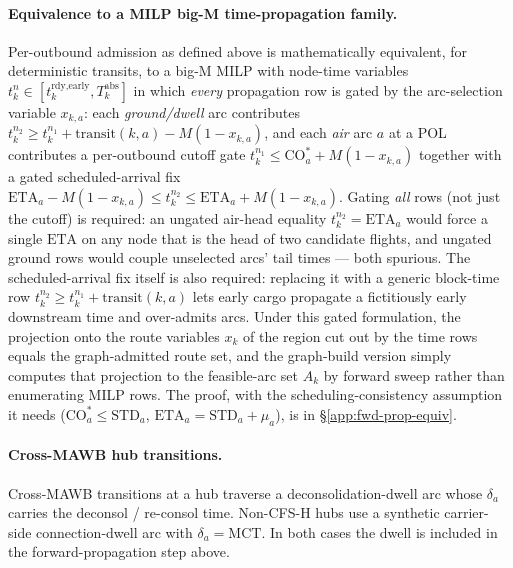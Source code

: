 \documentclass[11pt,a4paper]{article}
\theoremstyle{definition}
\begin{document}
\paragraph{Equivalence to a MILP big-M time-propagation family.}
Per-outbound admission as defined above is mathematically equivalent, for
deterministic transits, to a big-M MILP with node-time variables
$t_k^n \in [t_k^{\text{rdy,early}}, T_k^{\text{abs}}]$ in which \emph{every}
propagation row is gated by the arc-selection variable $x_{k,a}$: each
\emph{ground/dwell} arc contributes $t_k^{n_2} \geq t_k^{n_1} +
\text{transit}(k, a) - M(1 - x_{k,a})$, and each \emph{air} arc $a$ at a POL
contributes a per-outbound cutoff gate $t_k^{n_1} \leq \text{CO}_a^* +
M(1 - x_{k,a})$ together with a gated scheduled-arrival fix $\text{ETA}_a -
M(1 - x_{k,a}) \leq t_k^{n_2} \leq \text{ETA}_a + M(1 - x_{k,a})$. Gating
\emph{all} rows (not just the cutoff) is required: an ungated air-head
equality $t_k^{n_2} = \text{ETA}_a$ would force a single $\text{ETA}$ on any
node that is the head of two candidate flights, and ungated ground rows would
couple unselected arcs' tail times --- both spurious. The scheduled-arrival
fix itself is also required: replacing it with a generic block-time row
$t_k^{n_2} \geq t_k^{n_1} + \text{transit}(k,a)$ lets early cargo propagate a
fictitiously early downstream time and over-admits arcs. Under this gated
formulation, the projection onto the route variables $x_k$ of the region cut
out by the time rows equals the graph-admitted route set, and the graph-build
version simply computes that projection to the feasible-arc set $A_k$ by
forward sweep rather than enumerating MILP rows. The proof, with the
scheduling-consistency assumption it needs ($\text{CO}_a^* \leq \text{STD}_a$,
$\text{ETA}_a = \text{STD}_a + \mu_a$), is in \S\ref{app:fwd-prop-equiv}.

\paragraph{Cross-MAWB hub transitions.}
Cross-MAWB transitions at a hub traverse a deconsolidation-dwell arc whose
$\delta_a$ carries the deconsol / re-consol time. Non-CFS-H hubs use a
synthetic carrier-side connection-dwell arc with $\delta_a = \text{MCT}$. In
both cases the dwell is included in the forward-propagation step above.
\end{document}
